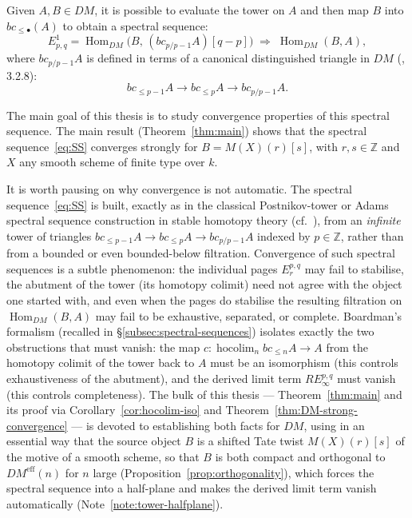 \documentclass[12pt,a4paper]{article}
\theoremstyle{definition}
\newcommand{\hocolim}{\operatorname*{hocolim}}
\newcommand{\Hom}{\operatorname{Hom}}
\newcommand{\Z}{\mathbb{Z}}
\begin{document}
Given $A, B \in DM$, it is possible to evaluate the tower on $A$ and then map $B$
into $bc_{\leq\bullet}(A)$ to obtain a spectral sequence:
\begin{equation}\label{eq:SS}
  E^1_{p,q} = \Hom_{DM}\!\bigl(B,\,(bc_{p/p-1}A)[q-p]\bigr)
  \;\Rightarrow\; \Hom_{DM}(B,A),
\end{equation}
where $bc_{p/p-1}A$ is defined in terms of a canonical distinguished triangle in
$DM$ (\cite{Pel17}, 3.2.8):
\[
  bc_{\leq p-1}A \to bc_{\leq p}A \to bc_{p/p-1}A.
\]

The main goal of this thesis is to study convergence properties of this spectral
sequence.  The main result (Theorem~\ref{thm:main}) shows that the spectral
sequence~\eqref{eq:SS} converges strongly for $B = M(X)(r)[s]$, with $r,s\in\Z$
and $X$ any smooth scheme of finite type over $k$.

It is worth pausing on why convergence is not automatic.  The spectral
sequence~\eqref{eq:SS} is built, exactly as in the classical Postnikov-tower or
Adams spectral sequence construction in stable homotopy theory
(cf.\ \cite{Boa99}), from an \emph{infinite} tower of triangles
$bc_{\leq p-1}A\to bc_{\leq p}A\to bc_{p/p-1}A$ indexed by $p\in\Z$, rather than
from a bounded or even bounded-below filtration.  Convergence of such spectral
sequences is a subtle phenomenon: the individual pages $E_r^{p,q}$ may
fail to stabilise, the abutment of the tower (its homotopy colimit) need not agree
with the object one started with, and even when the pages do stabilise the
resulting filtration on $\Hom_{DM}(B,A)$ may fail to be exhaustive, separated, or
complete.  Boardman's formalism (recalled in
\S\ref{subsec:spectral-sequences}) isolates exactly the two obstructions that must
vanish: the map $c:\hocolim_n bc_{\leq n}A\to A$ from the homotopy colimit of the
tower back to $A$ must be an isomorphism (this controls exhaustiveness of the
abutment), and the derived limit term $RE_\infty^{p,q}$ must vanish (this controls
completeness).  The bulk of this thesis — Theorem~\ref{thm:main} and its
proof via Corollary~\ref{cor:hocolim-iso} and
Theorem~\ref{thm:DM-strong-convergence} — is devoted to establishing both facts
for $DM$, using in an essential way that the source object $B$ is a shifted Tate
twist $M(X)(r)[s]$ of the motive of a smooth scheme, so that $B$ is both compact
and orthogonal to $DM^{\mathrm{eff}}(n)$ for $n$ large (Proposition~\ref{prop:orthogonality}),
which forces the spectral sequence into a half-plane and makes the derived limit
term vanish automatically (Note~\ref{note:tower-halfplane}).
\end{document}
